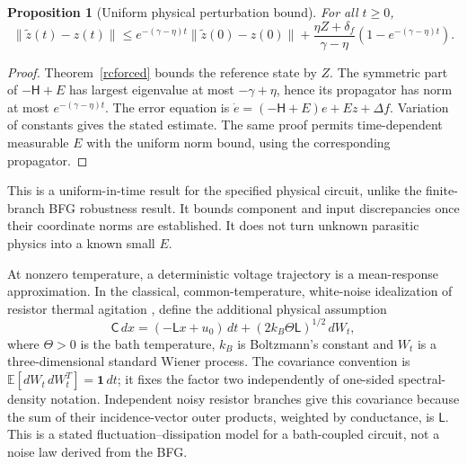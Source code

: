 \documentclass[11pt,letterpaper]{article}
\newcommand{\Id}{\mathbf 1}
\newtheorem{proposition}[theorem]{Proposition}
\theoremstyle{definition}
\numberwithin{equation}{section}
\begin{document}
\begin{proposition}[Uniform physical perturbation bound]\label{rcperturb}
For all $t\geq0$,
\begin{equation}\label{rcperturbbound}
\|\widetilde z(t)-z(t)\|\leq e^{-(\gamma-\eta)t}\|\widetilde z(0)-z(0)\|+\frac{\eta Z+\delta_f}{\gamma-\eta}(1-e^{-(\gamma-\eta)t}).
\end{equation}
\end{proposition}
\begin{proof}
Theorem~\ref{rcforced} bounds the reference state by $Z$. The symmetric part of $-\mathsf H+E$ has largest eigenvalue at most $-\gamma+\eta$, hence its propagator has norm at most $e^{-(\gamma-\eta)t}$. The error equation is $\dot e=(-\mathsf H+E)e+Ez+\Delta f$. Variation of constants gives the stated estimate. The same proof permits time-dependent measurable $E$ with the uniform norm bound, using the corresponding propagator.
\end{proof}
This is a uniform-in-time result for the specified physical circuit, unlike the finite-branch BFG robustness result. It bounds component and input discrepancies once their coordinate norms are established. It does not turn unknown parasitic physics into a known small $E$.

At nonzero temperature, a deterministic voltage trajectory is a mean-response approximation. In the classical, common-temperature, white-noise idealization of resistor thermal agitation \cite{nyquist}, define the additional physical assumption
\begin{equation}\label{rcsde}
\mathsf C\,dx=(-\mathsf Lx+u_0)\,dt+(2k_B\Theta\mathsf L)^{1/2}\,dW_t,
\end{equation}
where $\Theta>0$ is the bath temperature, $k_B$ is Boltzmann's constant and $W_t$ is a three-dimensional standard Wiener process. The covariance convention is $\mathbb E[dW_t\,dW_t^T]=\Id\,dt$; it fixes the factor two independently of one-sided spectral-density notation. Independent noisy resistor branches give this covariance because the sum of their incidence-vector outer products, weighted by conductance, is $\mathsf L$. This is a stated fluctuation--dissipation model for a bath-coupled circuit, not a noise law derived from the BFG.
\end{document}
